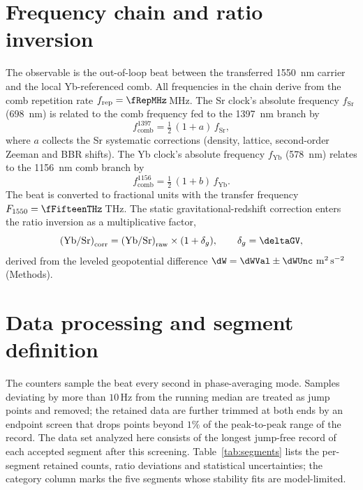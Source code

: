 \section{Frequency chain and ratio inversion}
\label{app:chain}

The observable is the out-of-loop beat between the transferred
\qty{1550}{nm} carrier and the local Yb-referenced comb. All
frequencies in the chain derive from the comb repetition rate
$f_{\mathrm{rep}} = \fRepMHz$\,MHz. The Sr clock's absolute frequency
$f_{\mathrm{Sr}}$ (\qty{698}{nm}) is related to the comb frequency fed
to the \qty{1397}{nm} branch by
\begin{equation}
  f_{\mathrm{comb}}^{1397} = \tfrac{1}{2}\,(1 + a)\,f_{\mathrm{Sr}},
\end{equation}
where $a$ collects the Sr systematic corrections (density, lattice,
second-order Zeeman and BBR shifts). The Yb clock's absolute frequency
$f_{\mathrm{Yb}}$ (\qty{578}{nm}) relates to the \qty{1156}{nm} comb
branch by
\begin{equation}
  f_{\mathrm{comb}}^{1156} = \tfrac{1}{2}\,(1 + b)\,f_{\mathrm{Yb}}.
\end{equation}
The beat is converted to fractional units with the transfer frequency
$F_{1550} = \fFifteenTHz$\,THz. The static gravitational-redshift
correction enters the ratio inversion as a multiplicative factor,
\begin{equation}
  \left(\mathrm{Yb/Sr}\right)_{\rm corr}
  = \left(\mathrm{Yb/Sr}\right)_{\rm raw} \times (1 + \delta_g),
  \qquad \delta_g = \deltaGV,
\end{equation}
derived from the leveled geopotential difference
$\dW = \dWVal \pm \dWUnc~\mathrm{m^2\,s^{-2}}$ (Methods).

\section{Data processing and segment definition}
\label{app:processing}

The counters sample the beat every second in phase-averaging mode.
Samples deviating by more than $10$\,Hz from the running median are
treated as jump points and removed; the retained data are further
trimmed at both ends by an endpoint screen that drops points beyond
$1\%$ of the peak-to-peak range of the record. The data set analyzed
here consists of the longest jump-free record of each accepted segment
after this screening. Table~\ref{tab:segments} lists the per-segment
retained counts, ratio deviations and statistical uncertainties; the
category column marks the five segments whose stability fits are
model-limited.

